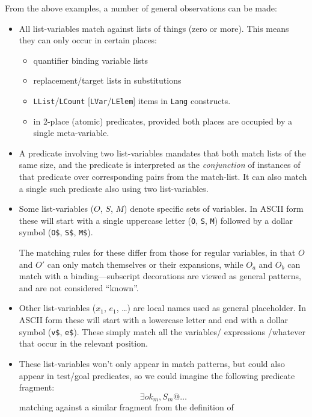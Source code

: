 From the above examples,
a number of general observations can be made:
\begin{itemize}
  \item
    All list-variables match against lists of things (zero or more).
    This means they can only occur in certain places:
    \begin{itemize}
      \item quantifier binding variable lists
      \item replacement/target lists in substitutions
      \item \texttt{LList}/\texttt{LCount} [\texttt{LVar}/\texttt{LElem}]
            items in \texttt{Lang} constructs.
      \item in 2-place (atomic) predicates, provided both places
        are occupied by a single meta-variable.
    \end{itemize}
  \item
    A  predicate involving two list-variables mandates that both
    match lists of the same size, and the predicate
    is interpreted as the \emph{conjunction} of instances of that predicate
    over corresponding pairs from the match-list.
    It can also match a single such predicate also using two list-variables.
  \item
    Some list-variables ($O$, $S$, $M$)
    denote specific sets of variables.
    In ASCII form these will start with a single uppercase letter
    (\texttt{O}, \texttt{S}, \texttt{M}) followed by a dollar symbol
    (\verb"O$", \verb"S$", \verb"M$").
    \par
    The matching rules for these differ from those for regular variables,
    in that $O$ and $O'$ can only match themselves or their expansions,
    while $O_a$ and $O_b$ can match with a binding---subscript decorations
    are viewed as general patterns, and are not considered ``known''.
  \item
    Other list-variables  ($x_1$, $e_1$, \ldots)
    are local names used as general placeholder.
    In ASCII form these will start with a lowercase letter
    and end with a dollar symbol (\verb"v$", \verb"e$").
    These simply match all the variables/ expressions /whatever
    that occur in the relevant position.
  \item
    These list-variables won't only appear in match patterns,
    but could also appear in test/goal predicates,
    so we could imagine the following predicate fragment:
    $$
       \exists ok_m,S_m @ \ldots
    $$
    matching against a similar fragment from the definition of

\end{itemize}
